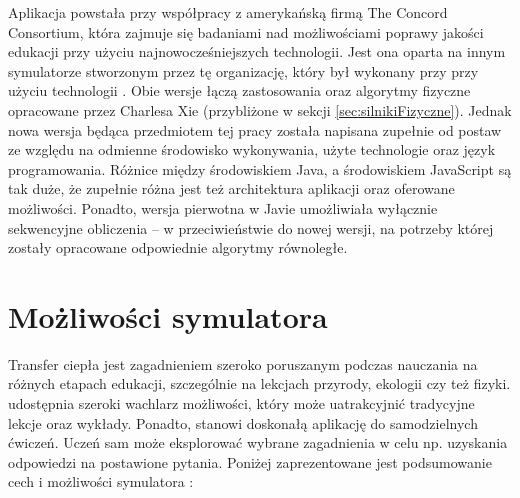 Aplikacja powstała przy współpracy z amerykańską firmą The Concord Consortium,
która zajmuje się badaniami nad możliwościami poprawy jakości edukacji przy
użyciu najnowocześniejszych technologii. Jest ona oparta na innym symulatorze
stworzonym przez tę organizację, który był wykonany przy przy użyciu technologii
. Obie wersje łączą zastosowania oraz algorytmy fizyczne opracowane
przez Charlesa Xie (przybliżone w sekcji \ref{sec:silnikiFizyczne}). Jednak nowa
wersja będąca przedmiotem tej pracy została napisana zupełnie od postaw ze
względu na odmienne środowisko wykonywania, użyte technologie oraz język
programowania. Różnice między środowiskiem Java, a środowiskiem JavaScript są
tak duże, że zupełnie różna jest też architektura aplikacji oraz oferowane
możliwości. Ponadto, wersja pierwotna w Javie umożliwiała wyłącznie sekwencyjne
obliczenia -- w przeciwieństwie do nowej wersji, na potrzeby której zostały
opracowane odpowiednie algorytmy równoległe.


\section{Możliwości symulatora}

Transfer ciepła jest zagadnieniem szeroko poruszanym podczas nauczania na
różnych etapach edukacji, szczególnie na lekcjach przyrody, ekologii czy też
fizyki. \en udostępnia szeroki wachlarz możliwości, który może uatrakcyjnić
tradycyjne lekcje oraz wykłady. Ponadto, stanowi doskonałą aplikację do
samodzielnych ćwiczeń. Uczeń sam może eksplorować wybrane zagadnienia w celu np.
uzyskania odpowiedzi na postawione pytania. Poniżej zaprezentowane jest
podsumowanie cech i możliwości symulatora \en:

